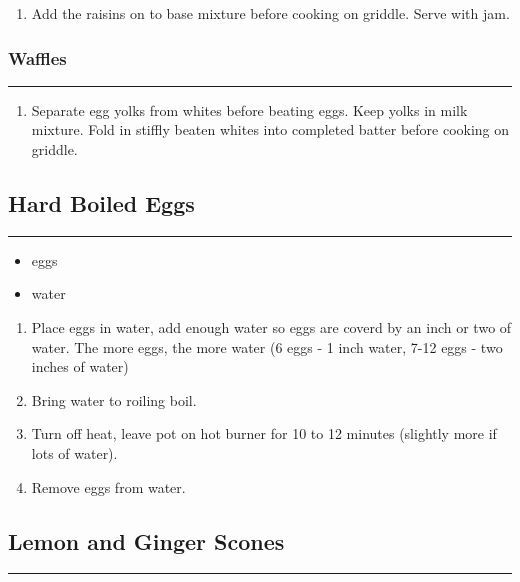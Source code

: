 \documentclass{article}
\begin{document}
\begin{enumerate}
    \item 
        Add the raisins on to base mixture before cooking on griddle. Serve with jam.
\end{enumerate}

\subsubsection{Waffles} 
\noindent\rule[0.5ex]{\linewidth}{0.5pt}

\begin{enumerate}
    \item 
        Separate egg yolks from whites before beating eggs. Keep yolks in milk mixture. Fold in stiffly beaten whites into completed batter before cooking on griddle.
\end{enumerate}
\newpage 

\subsection{Hard Boiled Eggs} 
\noindent\rule[0.5ex]{\linewidth}{1pt}

\begin{framed}
    \begin{itemize}
        \item eggs
        \item water
    \end{itemize}
\end{framed}

\begin{enumerate}
    \item 
        Place eggs in water, add enough water so eggs are coverd by an inch or two of water. The more eggs, the more water (6 eggs - 1 inch water, 7-12 eggs - two inches of water)
    \item 
        Bring water to roiling boil.
    \item 
        Turn off heat, leave pot on hot burner for 10 to 12 minutes (slightly more if lots of water).
    \item 
        Remove eggs from water.
\end{enumerate}
\newpage

\subsection{Lemon and Ginger Scones} 
\noindent\rule[0.5ex]{\linewidth}{1pt}
\end{document}
